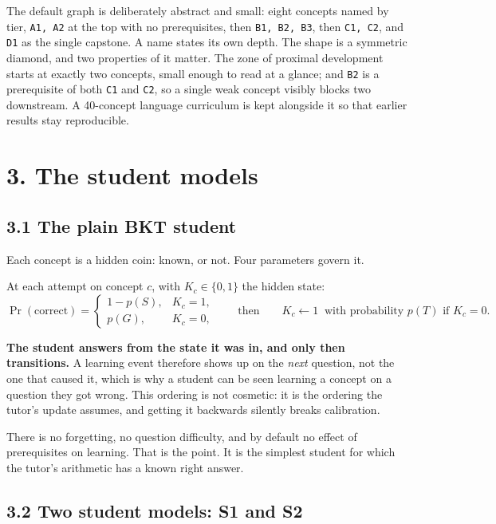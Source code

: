 \documentclass[11pt]{article}
\newcommand{\code}[1]{\texttt{\small #1}}
\begin{document}
The default graph is deliberately abstract and small: eight concepts named by
tier, \code{A1, A2} at the top with no prerequisites, then \code{B1, B2, B3},
then \code{C1, C2}, and \code{D1} as the single capstone. A name states its
own depth. The shape is a symmetric diamond, and two properties of it matter.
The zone of proximal development starts at exactly two concepts, small enough
to read at a glance; and \code{B2} is a prerequisite of both \code{C1} and
\code{C2}, so a single weak concept visibly blocks two downstream. A
40-concept language curriculum is kept alongside it so that earlier results
stay reproducible.

\section*{3. The student models}

\subsection*{3.1 The plain BKT student}

Each concept is a hidden coin: known, or not. Four parameters govern it.



At each attempt on concept $c$, with $K_c\in\{0,1\}$ the hidden state:
\begin{equation}
\Pr(\text{correct}) =
\begin{cases}
1-p(S), & K_c = 1,\\
p(G),   & K_c = 0,
\end{cases}
\qquad\text{then}\qquad
K_c \leftarrow 1 \ \text{ with probability } p(T) \text{ if } K_c = 0 .
\end{equation}

\textbf{The student answers from the state it was in, and only then
transitions.} A learning event therefore shows up on the \emph{next} question,
not the one that caused it, which is why a student can be seen learning a
concept on a question they got wrong. This ordering is not cosmetic: it is the
ordering the tutor's update assumes, and getting it backwards silently breaks
calibration.

There is no forgetting, no question difficulty, and by default no effect of
prerequisites on learning. That is the point. It is the simplest student for
which the tutor's arithmetic has a known right answer.

\subsection*{3.2 Two student models: S1 and S2}
\end{document}
